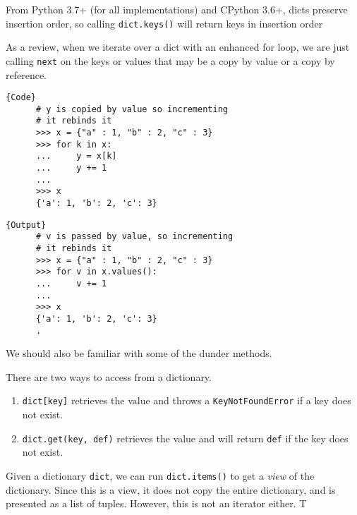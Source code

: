   \begin{theorem}
    From Python 3.7+ (for all implementations) and CPython 3.6+, dicts preserve insertion order, so calling \texttt{dict.keys()} will return keys in insertion order
  \end{theorem}

  \begin{example}
    As a review, when we iterate over a dict with an enhanced for loop, we are just calling \texttt{next} on the keys or values that may be a copy by value or a copy by reference. 

    \noindent\begin{minipage}{.5\textwidth}
    \begin{lstlisting}[]{Code}
      # y is copied by value so incrementing 
      # it rebinds it
      >>> x = {"a" : 1, "b" : 2, "c" : 3}
      >>> for k in x: 
      ...     y = x[k]
      ...     y += 1
      ... 
      >>> x
      {'a': 1, 'b': 2, 'c': 3} 
    \end{lstlisting}
    \end{minipage}
    \hfill
    \begin{minipage}{.49\textwidth}
    \begin{lstlisting}[]{Output}
      # v is passed by value, so incrementing 
      # it rebinds it
      >>> x = {"a" : 1, "b" : 2, "c" : 3}
      >>> for v in x.values(): 
      ...     v += 1
      ... 
      >>> x
      {'a': 1, 'b': 2, 'c': 3} 
      .
    \end{lstlisting}
    \end{minipage}
  \end{example}


  We should also be familiar with some of the dunder methods. 

  \begin{definition}[Get]
    There are two ways to access from a dictionary. 
    \begin{enumerate}
      \item \texttt{dict[key]} retrieves the value and throws a \texttt{KeyNotFoundError} if a key does not exist. 
      \item \texttt{dict.get(key, def)} retrieves the value and will return \texttt{def} if the key does not exist. 
    \end{enumerate}
  \end{definition}
  
  \begin{definition}[Items]
    Given a dictionary \texttt{dict}, we can run \texttt{dict.items()} to get a \textit{view} of the dictionary. Since this is a view, it does not copy the entire dictionary, and is presented as a list of tuples. However, this is not an iterator either. T 
  \end{definition}


